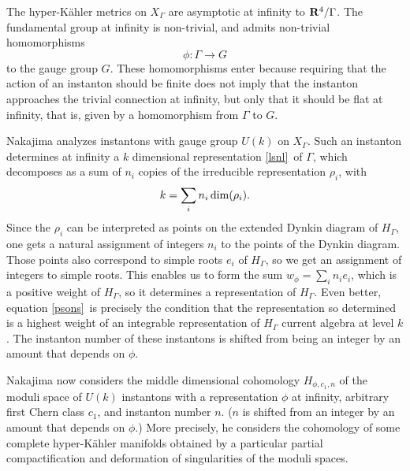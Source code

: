 \documentclass[12pt]{article}
\numberwithin{equation}{section}
\begin{document}
The hyper-K\"ahler metrics on $X_\Gamma$ are asymptotic at infinity
to ${\bf R}^4/\Gamma$.
The fundamental group at infinity is non-trivial, and admits
non-trivial homomorphisms
\begin{equation}
  \label{lsnl}
  \phi:\Gamma\to G
\end{equation}
to the gauge group $G$.  These homomorphisms enter because requiring
that the action of an instanton should be finite does not imply
that the instanton approaches the trivial connection at infinity,
but only that it should be flat at infinity, that
is, given by a homomorphism from $\Gamma$ to $G$.

Nakajima analyzes instantons with gauge group $U(k)$ on
$X_\Gamma$.
Such an instanton determines at infinity a $k$
dimensional representation \eqref{lsnl}\ of $\Gamma$, which decomposes
as a sum of $n_i$ copies of the irreducible representation
$\rho_i$, with
\begin{equation}
  \label{psons}
  k=\sum_in_i\,{\rm dim}(\rho_i).
\end{equation}
Since the $\rho_i$
can be interpreted as points on the extended Dynkin diagram of $H_\Gamma$,
one gets a natural assignment of integers $n_i$ to the points of the
Dynkin diagram.  Those points also correspond to simple roots $e_i$
of $H_\Gamma$, so we get an assignment of integers to simple roots.
This enables us to form the sum $w_\phi=\sum_in_ie_i$, which is a positive
weight of $H_\Gamma$, so it determines a representation of $H_\Gamma$.
Even better, equation \eqref{psons}\ is precisely the condition
that the representation so
determined is a highest weight of an integrable
representation of $H_\Gamma$ current algebra at level $k$.
The instanton number of these instantons is shifted from
being an integer by an amount that depends on $\phi$.

Nakajima now considers the middle dimensional cohomology $H_{\phi,c_1,n}$
of the moduli space of $U(k)$ instantons with a representation $\phi$
at infinity, arbitrary first Chern class $c_1$,
and instanton number $n$. ($n$ is shifted from an integer by an amount
that depends on  $\phi$.)   More precisely, he considers
the cohomology of some complete hyper-K\"ahler manifolds
obtained by a particular partial compactification  and deformation of
singularities of the moduli spaces.
\end{document}
